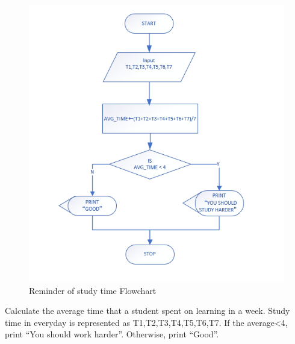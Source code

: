 \documentclass[runningheads]{llncs}
\begin{document}
\begin{figure}[H]
		\centering %
		\includegraphics[width=1.0\textwidth]{./figure/LLT/flow} %
		\caption{Reminder of study time Flowchart} %
		\label{flow} %
	\end{figure}
Calculate the average time that a student spent on learning in a week. Study time in everyday is represented as T1,T2,T3,T4,T5,T6,T7. If the average<4, print “You should work harder”. Otherwise, print “Good”.
\end{document}
